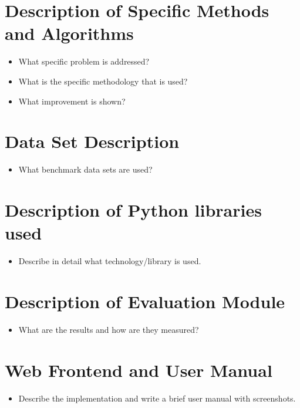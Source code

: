 \documentclass[12pt]%
{article}
\begin{document}
\section{Description of Specific Methods and Algorithms}


\begin{itemize}
\item What specific problem is addressed?
\item What is the specific methodology that is used?
\item What improvement is shown?

\end{itemize}

\section{Data Set Description}

\begin{itemize}

\item What benchmark data sets are used?
\end{itemize}

\section{Description of Python libraries used}

\begin{itemize}
\item Describe in detail what technology/library is used.
\end{itemize}

\section{Description of Evaluation Module}

\begin{itemize}
\item What are the results and how are they measured?
\end{itemize}

\section{Web Frontend and User Manual}


\begin{itemize}
\item Describe the implementation and write a brief user manual with screenshots.
\end{itemize}
\end{document}
